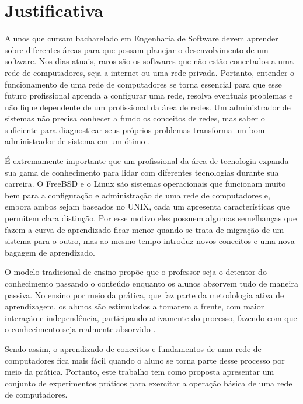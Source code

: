 \section{Justificativa}

Alunos que cursam bacharelado em Engenharia de Software devem aprender sobre diferentes áreas para que possam planejar o desenvolvimento de um software. Nos dias atuais, raros são os softwares que não estão conectados a uma rede de computadores, seja a internet ou uma rede privada. Portanto, entender o funcionamento de uma rede de computadores se torna essencial para que esse futuro profissional aprenda a configurar uma rede, resolva eventuais problemas e não fique dependente de um profissional da área de redes. Um administrador de sistemas não precisa conhecer a fundo os conceitos de redes, mas saber o suficiente para diagnosticar seus próprios problemas transforma um bom administrador de sistema em um ótimo \cite{Lucas2019}.

É extremamente importante que um profissional da área de tecnologia expanda sua gama de conhecimento para lidar com diferentes tecnologias durante sua carreira. O FreeBSD e o Linux são sistemas operacionais que funcionam muito bem para a configuração e administração de uma rede de computadores e, embora ambos sejam baseados no UNIX, cada um apresenta características que permitem clara distinção. Por esse motivo eles possuem algumas semelhanças que fazem a curva de aprendizado ficar menor quando se trata de migração de um sistema para o outro, mas ao mesmo tempo introduz novos conceitos e uma nova bagagem de aprendizado.

O modelo tradicional de ensino propõe que o professor seja o detentor do conhecimento passando o conteúdo enquanto os alunos absorvem tudo de maneira passiva. No ensino por meio da prática, que faz parte da metodologia ativa de aprendizagem, os alunos são estimulados a tomarem a frente, com maior interação e independência, participando ativamente do processo, fazendo com que o conhecimento seja realmente absorvido \cite{MetodologiaAtiva}.%

Sendo assim, o aprendizado de conceitos e fundamentos de uma rede de computadores fica mais fácil quando o aluno se torna parte desse processo por meio da prática. Portanto, este trabalho tem como proposta apresentar um conjunto de experimentos práticos para exercitar a operação básica de uma rede de computadores.